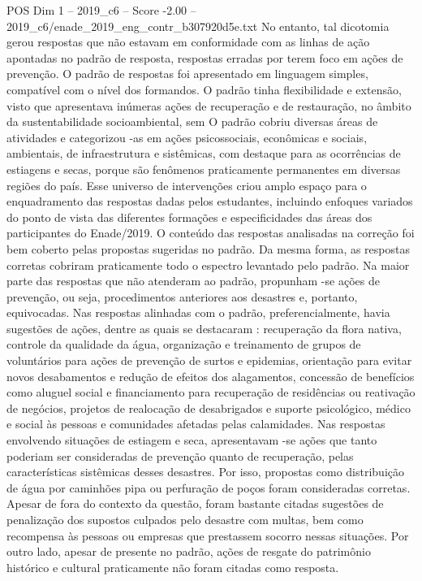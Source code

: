 \begin{textsample}{POS Dim 1 – 2019\_c6 – Score -2.00 – 2019\_c6/enade\_2019\_eng\_contr\_b307920d5e.txt}
No entanto, tal dicotomia gerou respostas que não estavam em conformidade com as linhas de ação apontadas no padrão de resposta, respostas erradas por terem foco em ações de prevenção.
O padrão de respostas foi apresentado em linguagem simples, compatível com o nível dos formandos.
O padrão tinha flexibilidade e extensão, visto que apresentava inúmeras ações de recuperação e de restauração, no âmbito da sustentabilidade socioambiental, sem O padrão cobriu diversas áreas de atividades e categorizou -as em ações psicossociais, econômicas e sociais, ambientais, de infraestrutura e sistêmicas, com destaque para as ocorrências de estiagens e secas, porque são fenômenos praticamente permanentes em diversas regiões do país.
Esse universo de intervenções criou amplo espaço para o enquadramento das respostas dadas pelos estudantes, incluindo enfoques variados do ponto de vista das diferentes formações e especificidades das áreas dos participantes do Enade/2019.
O conteúdo das respostas analisadas na correção foi bem coberto pelas propostas sugeridas no padrão.
Da mesma forma, as respostas corretas cobriram praticamente todo o espectro levantado pelo padrão.
Na maior parte das respostas que não atenderam ao padrão, propunham -se ações de prevenção, ou seja, procedimentos anteriores aos desastres e, portanto, equivocadas.
Nas respostas alinhadas com o padrão, preferencialmente, havia sugestões de ações, dentre as quais se destacaram : recuperação da flora nativa, controle da qualidade da água, organização e treinamento de grupos de voluntários para ações de prevenção de surtos e epidemias, orientação para evitar novos desabamentos e redução de efeitos dos alagamentos, concessão de benefícios como aluguel social e financiamento para recuperação de residências ou reativação de negócios, projetos de realocação de desabrigados e suporte psicológico, médico e social às pessoas e comunidades afetadas pelas calamidades.
Nas respostas envolvendo situações de estiagem e seca, apresentavam -se ações que tanto poderiam ser consideradas de prevenção quanto de recuperação, pelas características sistêmicas desses desastres.
Por isso, propostas como distribuição de água por caminhões pipa ou perfuração de poços foram consideradas corretas.
Apesar de fora do contexto da questão, foram bastante citadas sugestões de penalização dos supostos culpados pelo desastre com multas, bem como recompensa às pessoas ou empresas que prestassem socorro nessas situações.
Por outro lado, apesar de presente no padrão, ações de resgate do patrimônio histórico e cultural praticamente não foram citadas como resposta.

\end{textsample}
